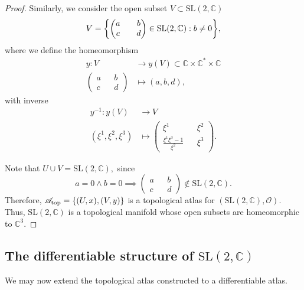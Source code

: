 \begin{proof}
    Similarly, we consider the open subset \(V \subset \mathrm{SL}(2, \mathbb{C})\)
    \begin{equation*}
        V = \set*{\begin{pmatrix}
                a && b\\c&&d
        \end{pmatrix} \in \mathrm{SL}(2, \mathbb{C}) : b \neq 0},
    \end{equation*}
    where we define the homeomorphism
    \begin{align*}
        y : V &\to y(V) \subset \mathbb{C}\times \mathbb{C}^{\ast} \times \mathbb{C}\\
            \begin{pmatrix}
                a && b\\c&&d
            \end{pmatrix}  &\mapsto (a,b,d),
    \end{align*}
    with inverse
    \begin{align*}
        y^{-1} : y(V) &\to V\\
              (\xi^1,\xi^2, \xi^3) &\mapsto \begin{pmatrix}
                  \xi^1 && \xi^2\\\frac{\xi^1 \xi^3 - 1}{\xi^2} && \xi^3
                      \end{pmatrix}.
    \end{align*}

    Note that \(U \cup V = \mathrm{SL}(2, \mathbb{C}),\) since
    \begin{equation*}
        a = 0 \land b = 0 \implies \begin{pmatrix}
            a && b\\c&&d
        \end{pmatrix} \notin \mathrm{SL}(2, \mathbb{C}).
    \end{equation*}
    Therefore, \(\mathscr{A}_{\mathrm{top}} = \{(U, x), (V, y)\}\) is a topological atlas for \((\mathrm{SL}(2, \mathbb{C}), \mathcal{O}).\) Thus, \(\mathrm{SL}(2, \mathbb{C})\) is a topological manifold whose open subsets are homeomorphic to \(\mathbb{C}^3.\)
\end{proof}

\subsection{The differentiable structure of \texorpdfstring{\(\mathrm{SL}(2,\mathbb{C})\)}{(2,C)}}
We may now extend the topological atlas constructed to a differentiable atlas.

